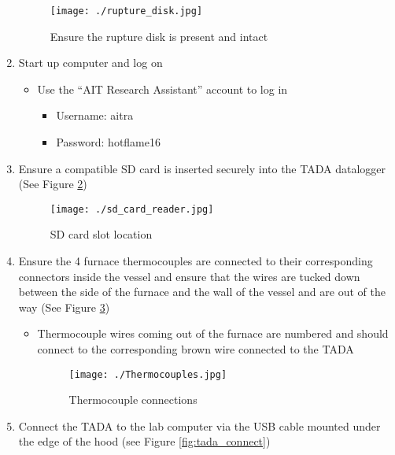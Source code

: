 \begin{enumerate}
  \begin{figure}
  \hypertarget{fig:rupture_disk}{%
  \centering
  \texttt{[image: ./rupture\_disk.jpg]}
  \caption{Ensure the rupture disk is present and
  intact}\label{fig:rupture_disk}
  }
  \end{figure}
\item
  Start up computer and log on

  \begin{itemize}
  \tightlist
  \item
    Use the ``AIT Research Assistant'' account to log in

    \begin{itemize}
    \tightlist
    \item
      Username: aitra
    \item
      Password: hotflame16
    \end{itemize}
  \end{itemize}
\item
  Ensure a compatible SD card is inserted securely into the TADA
  datalogger (See Figure \ref{fig:sd_card_reader})

  \begin{figure}
  \hypertarget{fig:sd_card_reader}{%
  \centering
  \texttt{[image: ./sd\_card\_reader.jpg]}
  \caption{SD card slot location}\label{fig:sd_card_reader}
  }
  \end{figure}
\item
  Ensure the 4 furnace thermocouples are connected to their
  corresponding connectors inside the vessel and ensure that the wires
  are tucked down between the side of the furnace and the wall of the
  vessel and are out of the way (See Figure \ref{fig:Thermocouples})

  \begin{itemize}
  \item
    Thermocouple wires coming out of the furnace are numbered and should
    connect to the corresponding brown wire connected to the TADA

    \begin{figure}
    \hypertarget{fig:Thermocouples}{%
    \centering
    \texttt{[image: ./Thermocouples.jpg]}
    \caption{Thermocouple connections}\label{fig:Thermocouples}
    }
    \end{figure}
  \end{itemize}
\item
  Connect the TADA to the lab computer via the USB cable mounted under
  the edge of the hood (see Figure \ref{fig:tada_connect})


\end{enumerate}
